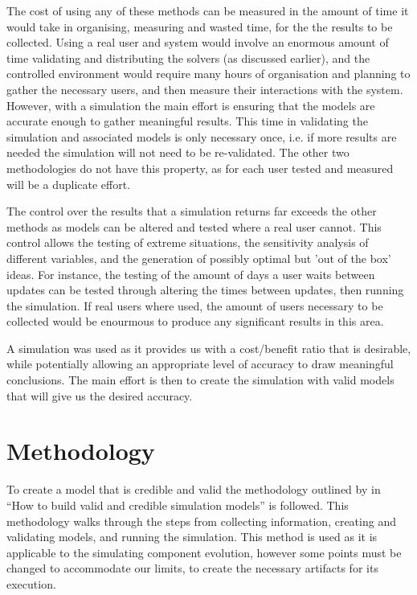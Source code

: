 The cost of using any of these methods can be measured in the amount of time it would take in organising, measuring and wasted time, for the the results to be collected.
Using a real user and system would involve an enormous amount of time validating and distributing the solvers (as discussed earlier), 
and the controlled environment would require many hours of organisation and planning to gather the necessary users, and then measure their interactions with the system.
However, with a simulation the main effort is ensuring that the models are accurate enough to gather meaningful results.
This time in validating the simulation and associated models is only necessary once, 
i.e. if more results are needed the simulation will not need to be re-validated.
The other two methodologies do not have this property, as for each user tested and measured will be a duplicate effort. 

The control over the results that a simulation returns far exceeds the other methods as models can be altered and tested where a real user cannot. 
This control allows the testing of extreme situations, the sensitivity analysis of different variables,
and the generation of possibly optimal but 'out of the box' ideas. 
For instance, the testing of the amount of days a user waits between updates can be tested through altering the times between updates, then running the simulation.
If real users where used, the amount of users necessary to be collected would be enourmous to produce any significant results in this area.

A simulation was used as it provides us with a cost/benefit ratio that is desirable, while potentially allowing an appropriate level of accuracy to draw meaningful conclusions.
The main effort is then to create the simulation with valid models that will give us the desired accuracy.

\section{Methodology}
{}To create a model that is credible and valid the methodology outlined by \cite{Law2005} in ``How to build valid and credible simulation models'' is followed.
{}This methodology walks through the steps from collecting information, creating and validating models, and running the simulation.
{}This method is used as it is applicable to the simulating component evolution, however some points must be changed to accommodate our limits, 
{}to create the necessary artifacts for its execution.  

